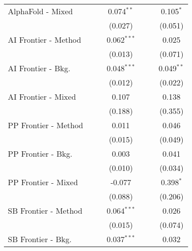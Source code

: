 \begin{tabular}{lcccccc}
   AlphaFold - Mixed    &               &               & 0.074$^{**}$  &               &               & 0.105$^{*}$\\   
                        &               &               & (0.027)       &               &               & (0.051)\\   
   AI Frontier - Method &               &               & 0.062$^{***}$ &               &               & 0.025\\   
                        &               &               & (0.013)       &               &               & (0.071)\\   
   AI Frontier - Bkg.   &               &               & 0.048$^{***}$ &               &               & 0.049$^{**}$\\   
                        &               &               & (0.012)       &               &               & (0.022)\\   
   AI Frontier - Mixed  &               &               & 0.107         &               &               & 0.138\\   
                        &               &               & (0.188)       &               &               & (0.355)\\   
   PP Frontier - Method &               &               & 0.011         &               &               & 0.046\\   
                        &               &               & (0.015)       &               &               & (0.049)\\   
   PP Frontier - Bkg.   &               &               & 0.003         &               &               & 0.041\\   
                        &               &               & (0.010)       &               &               & (0.034)\\   
   PP Frontier - Mixed  &               &               & -0.077        &               &               & 0.398$^{*}$\\   
                        &               &               & (0.088)       &               &               & (0.206)\\   
   SB Frontier - Method &               &               & 0.064$^{***}$ &               &               & 0.026\\   
                        &               &               & (0.015)       &               &               & (0.074)\\   
   SB Frontier - Bkg.   &               &               & 0.037$^{***}$ &               &               & 0.032\\   

\end{tabular}
